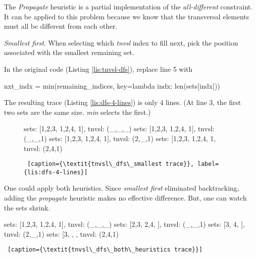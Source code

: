 The \textit{Propagate} heuristic is a partial implementation of the \textit{all-different} constraint. It can be applied to this problem because we know that the transversal elements must all be different from each other.

\noindent\textit{Smallest first}. When selecting which \textit{tnvsl} index to fill next, pick the position associated with the smallest remaining set. 

In the original code (Listing \ref{lis:tnvsl-dfs}), replace line 5 with
\begin{center}
\begin{minipage}[c]{0.45\textwidth}
\begin{python1}
 nxt_indx = min(remaining_indices,
                key=lambda indx: len(sets[indx]))
\end{python1}
\end{minipage}
\end{center}

The resulting trace (Listing \ref{lis:dfs-4-lines}) is only 4 lines. (At line 3, the first two sets are the same size. \textit{min} selects the first.) 

\begin{figure}[htb]
    \centering\begin{minipage}[c]{0.45\textwidth}
\begin{python1}  
sets: [{1,2,3}, {1,2,4}, {1}], tnvsl: (_,_,_)
  sets: [{1,2,3}, {1,2,4}, {1}], tnvsl: (_,_,1)
    sets: [{1,2,3}, {1,2,4}, {1}], tnvsl: (2,_,1)
      sets: [{1,2,3}, {1,2,4}, {1}, tnvsl: (2,4,1)
\end{python1}\linv
\begin{lstlisting} [caption={\textit{tnvsl\_dfs\_smallest trace}}, label={lis:dfs-4-lines}]
\end{lstlisting}
\end{minipage}\linv
\end{figure}

One could apply both heuristics. Since \textit{smallest first} eliminated backtracking, adding the \textit{propagate} heuristic makes no effective difference. But, one can watch the sets shrink.

\mediumv
\begin{minipage}[c]{0.45\textwidth}
\begin{python1} 
sets: [{1,2,3}, {1,2,4}, {1}], tnvsl: (_,_,_)
  sets: [{2,3}, {2,4}, {}], tnvsl: (_,_,1)
    sets: [{3}, {4}, {}], tnvsl: (2,_,1)
      sets: [{3}, {}, {}, tnvsl: (2,4,1)
\end{python1}\linv
\begin{lstlisting} [caption={\textit{tnvsl\_dfs\_both\_heuristics trace}}]
\end{lstlisting}
\end{minipage}

